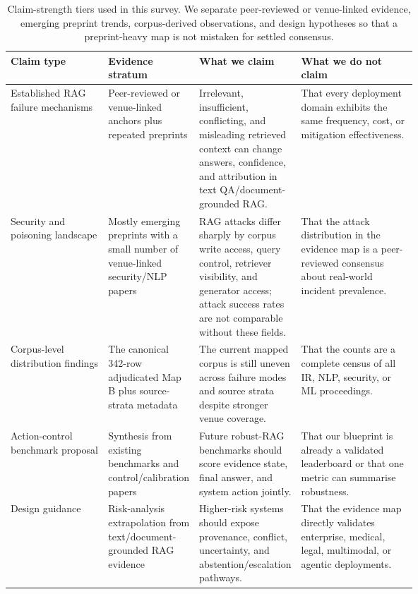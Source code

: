 \begin{table}[t]
\centering
\scriptsize
\renewcommand{\arraystretch}{0.95}
\begin{tabularx}{\linewidth}{>{\raggedright\arraybackslash}p{0.24\linewidth}>{\raggedright\arraybackslash}p{0.18\linewidth}>{\raggedright\arraybackslash}p{0.25\linewidth}X}
\toprule
\textbf{Claim type} & \textbf{Evidence stratum} & \textbf{What we claim} & \textbf{What we do not claim} \\
\midrule
Established RAG failure mechanisms & Peer-reviewed or venue-linked anchors plus repeated preprints & Irrelevant, insufficient, conflicting, and misleading retrieved context can change answers, confidence, and attribution in text QA/document-grounded RAG. & That every deployment domain exhibits the same frequency, cost, or mitigation effectiveness. \\
Security and poisoning landscape & Mostly emerging preprints with a small number of venue-linked security/NLP papers & RAG attacks differ sharply by corpus write access, query control, retriever visibility, and generator access; attack success rates are not comparable without these fields. & That the attack distribution in the evidence map is a peer-reviewed consensus about real-world incident prevalence. \\
Corpus-level distribution findings & The canonical 342-row adjudicated Map B plus source-strata metadata & The current mapped corpus is still uneven across failure modes and source strata despite stronger venue coverage. & That the counts are a complete census of all IR, NLP, security, or ML proceedings. \\
Action-control benchmark proposal & Synthesis from existing benchmarks and control/calibration papers & Future robust-RAG benchmarks should score evidence state, final answer, and system action jointly. & That our blueprint is already a validated leaderboard or that one metric can summarise robustness. \\
Design guidance & Risk-analysis extrapolation from text/document-grounded RAG evidence & Higher-risk systems should expose provenance, conflict, uncertainty, and abstention/escalation pathways. & That the evidence map directly validates enterprise, medical, legal, multimodal, or agentic deployments. \\
\bottomrule
\end{tabularx}
\caption{Claim-strength tiers used in this survey. We separate peer-reviewed or venue-linked evidence, emerging preprint trends, corpus-derived observations, and design hypotheses so that a preprint-heavy map is not mistaken for settled consensus.}
\label{tab:claim-strength}
\end{table}
